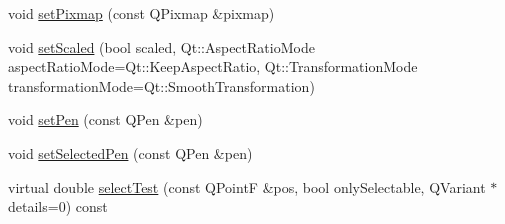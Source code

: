 \begin{DoxyCompactItemize}
\item 
void \hyperlink{class_q_c_p_item_pixmap_a726b69ea4025edf48f9b29b6450548a7}{set\+Pixmap} (const Q\+Pixmap \&pixmap)
\item 
void \hyperlink{class_q_c_p_item_pixmap_ab4d44529a1c6c8d37d0ea7560e042777}{set\+Scaled} (bool scaled, Qt\+::\+Aspect\+Ratio\+Mode aspect\+Ratio\+Mode=Qt\+::\+Keep\+Aspect\+Ratio, Qt\+::\+Transformation\+Mode transformation\+Mode=Qt\+::\+Smooth\+Transformation)
\item 
void \hyperlink{class_q_c_p_item_pixmap_acdade1305edb4b5cae14f97fd132065f}{set\+Pen} (const Q\+Pen \&pen)
\item 
void \hyperlink{class_q_c_p_item_pixmap_afc5e479e88e53740176ce77cb70dd67a}{set\+Selected\+Pen} (const Q\+Pen \&pen)
\item 
virtual double \hyperlink{class_q_c_p_item_pixmap_a9f8436aa141fa0fb504191c882c2f4d9}{select\+Test} (const Q\+PointF \&pos, bool only\+Selectable, Q\+Variant $\ast$details=0) const 
\end{DoxyCompactItemize}
